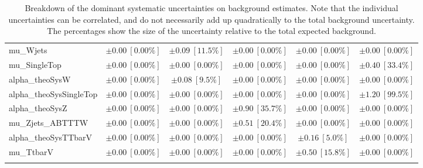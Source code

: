 \begin{sidewaystable}
\begin{center}
\begin{tabular*}{\textwidth}{@{\extracolsep{\fill}}lccccc}
mu\_Wjets         & $\pm 0.00\ [0.00\%] $          & $\pm 0.09\ [11.5\%] $          & $\pm 0.00\ [0.00\%] $          & $\pm 0.00\ [0.00\%] $          & $\pm 0.00\ [0.00\%] $       \\
mu\_SingleTop         & $\pm 0.00\ [0.00\%] $          & $\pm 0.00\ [0.00\%] $          & $\pm 0.00\ [0.00\%] $          & $\pm 0.00\ [0.00\%] $          & $\pm 0.40\ [33.4\%] $       \\
alpha\_theoSysW         & $\pm 0.00\ [0.00\%] $          & $\pm 0.08\ [9.5\%] $          & $\pm 0.00\ [0.00\%] $          & $\pm 0.00\ [0.00\%] $          & $\pm 0.00\ [0.00\%] $       \\
alpha\_theoSysSingleTop         & $\pm 0.00\ [0.00\%] $          & $\pm 0.00\ [0.00\%] $          & $\pm 0.00\ [0.00\%] $          & $\pm 0.00\ [0.00\%] $          & $\pm 1.20\ [99.5\%] $       \\
alpha\_theoSysZ         & $\pm 0.00\ [0.00\%] $          & $\pm 0.00\ [0.00\%] $          & $\pm 0.90\ [35.7\%] $          & $\pm 0.00\ [0.00\%] $          & $\pm 0.00\ [0.00\%] $       \\
mu\_Zjets\_ABTTTW         & $\pm 0.00\ [0.00\%] $          & $\pm 0.00\ [0.00\%] $          & $\pm 0.51\ [20.4\%] $          & $\pm 0.00\ [0.00\%] $          & $\pm 0.00\ [0.00\%] $       \\
alpha\_theoSysTTbarV         & $\pm 0.00\ [0.00\%] $          & $\pm 0.00\ [0.00\%] $          & $\pm 0.00\ [0.00\%] $          & $\pm 0.16\ [5.0\%] $          & $\pm 0.00\ [0.00\%] $       \\
mu\_TtbarV         & $\pm 0.00\ [0.00\%] $          & $\pm 0.00\ [0.00\%] $          & $\pm 0.00\ [0.00\%] $          & $\pm 0.50\ [15.8\%] $          & $\pm 0.00\ [0.00\%] $       \\
\noalign{\smallskip}\hline\noalign{\smallskip}
\end{tabular*}
\end{center}
\caption[Breakdown of uncertainty on background estimates]{
Breakdown of the dominant systematic uncertainties on background estimates.
Note that the individual uncertainties can be correlated, and do not necessarily add up quadratically to 
the total background uncertainty. The percentages show the size of the uncertainty relative to the total expected background.
\label{table.results.bkgestimate.uncertainties.SRA_TT_bybkg}}
\end{sidewaystable}
%